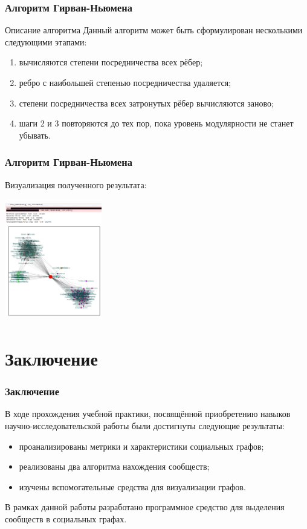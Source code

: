 \documentclass{spbseu}
\begin{document}
    \begin{frame}
		\frametitle{Алгоритм Гирван-Ньюмена}
        \begin{block}{Описание алгоритма}
            \justifying
            Данный алгоритм может быть сформулирован несколькими следующими этапами:
            \begin{enumerate}
                \item вычисляются степени посредничества всех рёбер;
                \item ребро с наибольшей степенью посредничества удаляется;
                \item степени посредничества всех затронутых рёбер вычисляются заново;
                \item шаги 2 и 3 повторяются до тех пор, пока уровень модулярности не станет убывать.
            \end{enumerate}
        \end{block}
    \end{frame}
    
    \begin{frame}
		\frametitle{Алгоритм Гирван-Ньюмена}
        Визуализация полученного результата:
        \begin{center}
            \includegraphics[width=160px,height=200px]{images/gn_results}
        \end{center}
    \end{frame}
    
    \section{Заключение}

    \begin{frame}
		\frametitle{Заключение}
        \tableofcontents[part=6, pausesections]
        В ходе прохождения учебной практики, посвящённой приобретению навыков научно-исследовательской работы были достигнуты следующие результаты:
        \begin{itemize}
            \item проанализированы метрики и характеристики социальных графов;
            \item реализованы два алгоритма нахождения сообществ;
            \item изучены вспомогательные средства для визуализации графов.
        \end{itemize}
        В рамках данной работы разработано программное средство для выделения сообществ в социальных графах.
    \end{frame}
\end{document}
